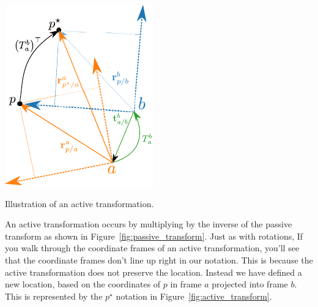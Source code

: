 \begin{marginfigure}
\includegraphics[width=\linewidth]{chap2_preliminaries/figures/transform_active}
\caption{Illustration of an active transformation.}
\label{fig:active_transform}
\end{marginfigure}

An active transformation occurs by multiplying by the inverse of the
passive transform as shown in Figure~\ref{fig:passive_transform}.
Just as with rotations, If you walk through the coordinate frames
of an active transformation, you'll see that the coordinate frames
don't line up right in our notation. This is because the active transformation
does not preserve the location. Instead we have defined a new location,
based on the coordinates of $p$ in frame $a$ projected into frame
$b$. This is represented by the $p^{\star}$ notation
in Figure~\ref{fig:active_transform}.


